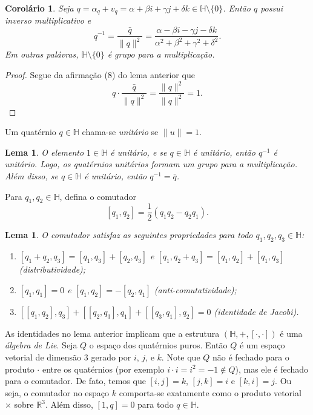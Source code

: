 \documentclass[12pt]{amsart}
\newcommand{\Ha}{\mathbb H}
\newcommand{\R}{\mathbb R}
\newtheorem{corollary}[theorem]{Corolário}
\newtheorem{lemma}[theorem]{Lema}
\theoremstyle{definition}
\begin{document}
\begin{corollary}
    Seja $q=\alpha_q+v_q=\alpha+\beta i+\gamma j+\delta k\in\Ha\setminus\{0\}$. Então $q$ possui inverso multiplicativo 
    e 
    \[
        q^{-1}=\frac{\bar q}{\|q\|^2}=\frac{\alpha-\beta i-\gamma j-\delta k}{\alpha^2+\beta^2+\gamma^2+\delta^2}.
    \]
    Em outras palávras, $\Ha\setminus\{0\}$ é grupo para a multiplicação.
\end{corollary}
\begin{proof}
    Segue da afirmação (8) do lema anterior que 
    \[
        q\cdot \frac{\bar q}{\|q\|^2}=\frac{\|q\|^2}{\|q\|^2}=1.
    \]
\end{proof}

Um quatérnio $q\in\Ha$ chama-se \emph{unitário} se $\|u\|=1$.

\begin{lemma}
    O elemento $1\in\Ha$ é unitário, e se $q\in\Ha$ é unitário, então $q^{-1}$ é unitário. Logo, os quatérnios unitários formam um grupo para a multiplicação. Além disso, se $q\in\Ha$ é unitário, então $q^{-1}=\bar q$.   
\end{lemma}

Para $q_1,q_2\in\Ha$, defina o comutador 
\[
    [q_1,q_2]=\frac 12(q_1q_2-q_2q_1).
\]

\begin{lemma}
    O comutador satisfaz as seguintes propriedades para todo $q_1,q_2,q_3\in\Ha$:
    \begin{enumerate}
        \item $[q_1+q_2,q_3]=[q_1,q_3]+[q_2,q_3]$ e $[q_1,q_2+q_3]=[q_1,q_2]+[q_1,q_3]$ (distributividade);
        \item $[q_1,q_1]=0$ e $[q_1,q_2]=-[q_2,q_1]$ (anti-comutatividade);
        \item $[[q_1,q_2],q_3]+[[q_2,q_3],q_1]+[[q_3,q_1],q_2]=0$ (identidade de Jacobi).
    \end{enumerate}
\end{lemma}


As identidades no lema anterior implicam que a estrutura $(\Ha,+,[\cdot,\cdot])$ é uma \emph{álgebra de Lie}. 
Seja $Q$ o espaço dos quatérnios puros. Então $Q$ é um espaço vetorial de dimensão 3 gerado por $i$, $j$, e $k$. Note que $Q$ não é fechado para o produto $\cdot$ entre os quatérnios (por exemplo $i\cdot i=i^2=-1\not\in Q$), mas ele é fechado para o comutador. 
De fato, temos que $[i,j]=k$, $[j,k]=i$ e $[k,i]=j$. Ou seja, o comutador no espaço $k$ comporta-se 
exatamente como o produto vetorial $\times$ sobre $\R^3$. Além disso, $[1,q]=0$ para todo $q\in\Ha$.  
\end{document}
